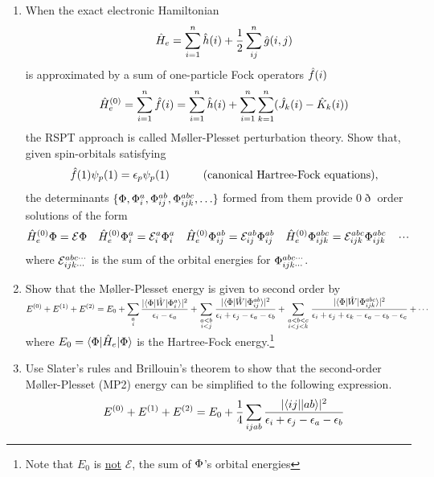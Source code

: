 \documentclass[fleqn,11pt]{article}
\begin{document}
\begin{enumerate}
\item
When the exact electronic Hamiltonian
\begin{align*}
&&
  \hat{H}_e
=
  \sum_{i=1}^n
  \hat{h}(i)
+
  \dfrac{1}{2}
  \sum_{ij}^n
  \hat{g}(i,j)
\end{align*}
is approximated by a sum of one-particle Fock operators $\hat{f}(i)$
\begin{align*}
&&
  \hat{H}_e^{(0)}
=
  \sum_{i=1}^n
  \hat{f}(i)
=
  \sum_{i=1}^n
  \hat{h}(i)
+
  \sum_{i=1}^n
  \sum_{k=1}^n
  (\hat{J}_k(i)-\hat{K}_k(i))
\end{align*}
the RSPT approach is called M\o ller-Plesset perturbation theory.
Show that, given spin-orbitals satisfying 
\begin{align}
&&
  \hat{f}(1)\psi_p(1)
=
  \epsilon_p\psi_p(1)\hspace{30pt} \text{(canonical Hartree-Fock equations)},
\end{align}
the determinants $\{\Phi,\Phi_i^a,\Phi_{ij}^{ab},\Phi_{ijk}^{abc},\ldots\}$ formed from them provide $0\eth$ order solutions of the form
\begin{align}
&
  \hat{H}_e^{(0)}\Phi
=
  \mathcal{E}\Phi
&&
  \hat{H}_e^{(0)}\Phi_i^a
=
  \mathcal{E}_i^a\Phi_i^a
&&
  \hat{H}_e^{(0)}\Phi_{ij}^{ab}
=
  \mathcal{E}_{ij}^{ab}\Phi_{ij}^{ab}
&&
  \hat{H}_e^{(0)}\Phi_{ijk}^{abc}
=
  \mathcal{E}_{ijk}^{abc}\Phi_{ijk}^{abc}
&&
  \mathinner{\mkern-1mu\cdotp\mkern-2mu\cdotp\mkern-2mu\cdotp\mkern-1mu}
\end{align}
where $\mathcal{E}_{ijk\cdots}^{abc\cdots}$ is the sum of the orbital energies for $\Phi_{ijk\cdots}^{abc\cdots}$.

\item Show that the M\o ller-Plesset energy is given to second order by\\[5pt]
$\displaystyle
  E^{(0)}
+
  E^{(1)}
+
  E^{(2)}
=
  E_0
+
  \sum_{\begin{smallmatrix}a\\i\end{smallmatrix}}
  \dfrac{|\langle\Phi|\hat{W}|\Phi_i^a\rangle|^2}{\epsilon_i-\epsilon_a}
+
  \sum_{\begin{smallmatrix}a<b\\i<j\end{smallmatrix}}
  \dfrac{|\langle\Phi|\hat{W}|\Phi_{ij}^{ab}\rangle|^2}{\epsilon_i+\epsilon_j-\epsilon_a-\epsilon_b}
+
  \sum_{\begin{smallmatrix}a<b<c\\i<j<k\end{smallmatrix}}
  \dfrac{|\langle\Phi|\hat{W}|\Phi_{ijk}^{abc}\rangle|^2}{\epsilon_i+\epsilon_j+\epsilon_k-\epsilon_a-\epsilon_b-\epsilon_c}
+
  \cdots
$\\[5pt]
where $E_0=\langle\Phi|\hat{H}_e|\Phi\rangle$ is the Hartree-Fock energy.\footnote{Note that $E_0$ is \underline{not} $\mathcal{E}$, the sum of $\Phi$'s orbital energies}

\item Use Slater's rules and Brillouin's theorem to show that the second-order M\o ller-Plesset (MP2) energy can be simplified to the following expression.
\begin{align}
&&
  E^{(0)}
+
  E^{(1)}
+
  E^{(2)}
=
  E_0
+
  \dfrac{1}{4}
  \sum_{ijab}
  \dfrac{|\langle ij||ab\rangle|^2}{\epsilon_i+\epsilon_j-\epsilon_a-\epsilon_b}
\end{align}
\end{enumerate}
\end{document}
